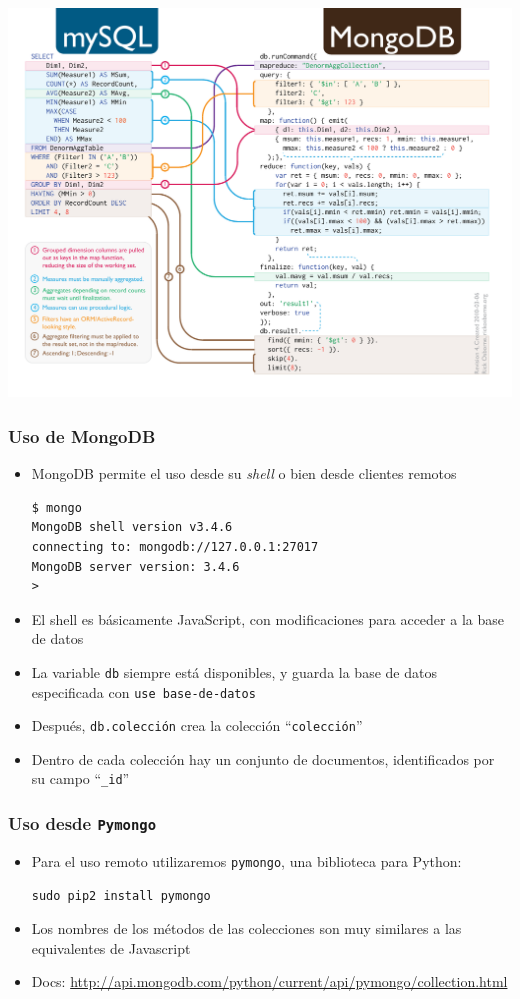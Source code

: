 \documentclass[14pt]{beamer}
\begin{document}
\begin{frame}[plain]
  \includegraphics[width=\textwidth]{img/sql-to-mongodb}
\end{frame}

\begin{frame}
  \frametitle{Uso de MongoDB}
  \begin{itemize}
  \item MongoDB permite el uso desde su {\em shell} o bien desde clientes
    remotos
\begin{verbatim}
$ mongo
MongoDB shell version v3.4.6
connecting to: mongodb://127.0.0.1:27017
MongoDB server version: 3.4.6
>
\end{verbatim}
    \item El shell es básicamente JavaScript, con modificaciones para
      acceder a la base de datos
    \item La variable {\tt db} siempre está disponibles, y guarda la base
      de datos especificada con {\tt use~base-de-datos}
    \item Después, {\tt db.colección} crea la colección ``{\tt colección}''
    \item Dentro de cada colección hay un conjunto de documentos,
      identificados por su campo ``{\tt \_id}''
  \end{itemize}
\end{frame}

\begin{frame}
  \frametitle{Uso desde {\tt Pymongo}}

\begin{itemize}
\item Para el uso remoto utilizaremos {\tt pymongo}, una biblioteca para
  Python:
\begin{verbatim}
sudo pip2 install pymongo
\end{verbatim}
\item Los nombres de los métodos de las colecciones son muy similares a las
  equivalentes de Javascript
\item Docs:
  \url{http://api.mongodb.com/python/current/api/pymongo/collection.html}
\end{itemize}

\end{frame}
\end{document}
